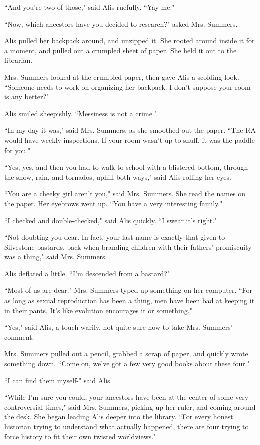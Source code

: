 \documentclass{report}
\begin{document}
``And you're two of those," said Alis ruefully. ``Yay me."

``Now, which ancestors have you decided to research?" asked Mrs. Summers.

Alis pulled her backpack around, and unzipped it. She rooted around inside it for a moment, and pulled out a crumpled sheet of paper. She held it out to the
librarian. 

Mrs. Summers looked at the crumpled paper, then gave Alis a scolding look. ``Someone needs to work on organizing her backpack. I don't suppose your room is any better?"

Alis smiled sheepishly. ``Messiness is not a crime."

``In my day it was," said Mrs. Summers, as she smoothed out the paper. ``The RA would have weekly inspections. If your room wasn't up to snuff, it was the paddle
for you."

``Yes, yes, and then you had to walk to school with a blistered bottom, through the snow, rain, and tornados, uphill both ways," said Alis rolling her eyes.

``You are a cheeky girl aren't you," said Mrs. Summers. She read the names on the paper. Her eyebrows went up. ``You have a very interesting family."

``I checked and double-checked," said Alis quickly. ``I swear it's right."

``Not doubting you dear. In fact, your last name is exactly that given to Silvestone bastards, back when branding children with their fathers' promiscuity was a thing," 
said Mrs. Summers.

Alis deflated a little. ``I'm descended from a bastard?"

``Most of us are dear." Mrs. Summers typed up something on her computer. ``For as long as sexual reproduction has been a thing, men have been bad at keeping it in
their pants. It's like evolution encourages it or something."

``Yes," said Alis, a touch warily, not quite sure how to take Mrs. Summers' comment.

Mrs. Summers pulled out a pencil, grabbed a scrap of paper, and quickly wrote something down. ``Come on, we've got a few very good books about these four."

``I can find them myself-" said Alis.

``While I'm sure you could, your ancestors have been at the center of some very controversial times," said Mrs. Summers, picking up her ruler, and coming around the 
desk. She began leading
Alis deeper into the library. ``For every honest historian trying to understand what actually happened, there are four trying to force history to fit their own twisted
worldviews."
\end{document}
